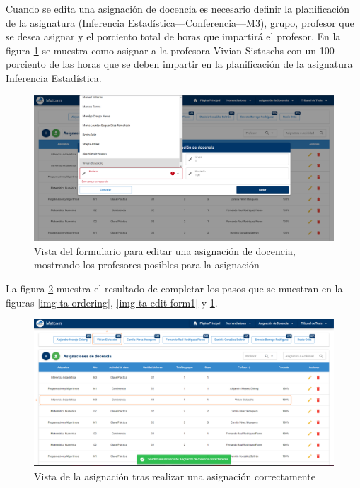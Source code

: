 Cuando se edita una asignación de docencia es necesario definir la planificación de 
la asignatura (Inferencia Estadística---Conferencia---M3), grupo, profesor que se 
desea asignar y el porciento total de horas que impartirá el profesor. En la figura
\ref{img-ta-edit-form2} se muestra como asignar a la profesora Vivian Sistaschs con un 100
porciento de las horas que se deben impartir en la planificación de la asignatura Inferencia Estadística. 

\begin{figure}[H]
    \includegraphics[scale=0.3]{Graphics/Implementation/Docencia/AD-edit-form2.png}
    \caption{Vista del formulario para editar una asignación de docencia, mostrando los profesores posibles para la asignación}
    \label{img-ta-edit-form2}
\end{figure}



La figura \ref{img-ta-result} muestra el resultado de completar los pasos
que se muestran en la figuras \ref{img-ta-ordering}, \ref{img-ta-edit-form1} y \ref{img-ta-edit-form2}.

\begin{figure}[H]
    \includegraphics[scale=0.3]{Graphics/Implementation/Docencia/AD-result.png}
    \caption{Vista de la asignación tras realizar una asignación correctamente}
    \label{img-ta-result}
\end{figure}

